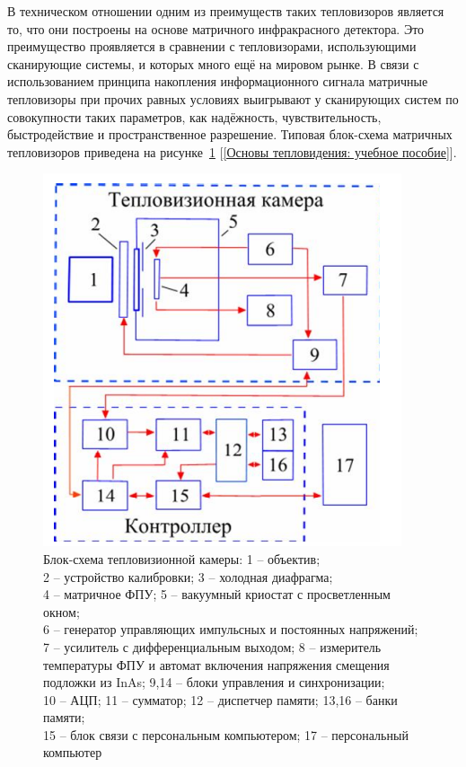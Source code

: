 \documentclass[14pt, a4paper]{extreport}
\begin{document}
	В техническом отношении одним из преимуществ таких тепловизоров является то, что они построены на основе матричного инфракрасного детектора. Это преимущество проявляется в сравнении с тепловизорами, использующими сканирующие системы, и которых много ещё на мировом рынке. В связи с использованием принципа накопления информационного сигнала матричные тепловизоры при прочих равных условиях выигрывают у сканирующих систем по совокупности таких параметров, как надёжность, чувствительность, быстродействие и пространственное разрешение. Типовая блок-схема матричных тепловизоров приведена на рисунке~\ref{fig:MatrixIRCameraScheme} [\ref{Основы тепловидения: учебное пособие}].
	
	\begin{figure}[h!]
		\centering
		\includegraphics[width = \textwidth]{image/chapter_1/MatrixIRCameraScheme}	
		\caption{Блок-схема тепловизионной камеры: 1 -- объектив;\\2 -- устройство калибровки; 3 -- холодная диафрагма;\\4 -- матричное ФПУ; 5 -- вакуумный криостат с просветленным окном;\\6 -- генератор управляющих импульсных и постоянных напряжений;\\7 -- усилитель с дифференциальным выходом; 8 -- измеритель температуры ФПУ и автомат включения напряжения смещения подложки из InAs; 9,14 -- блоки управления и синхронизации;\\10 -- АЦП; 11 -- сумматор; 12 -- диспетчер памяти; 13,16 -- банки памяти;\\15 -- блок связи с персональным компьютером; 17 -- персональный компьютер}
		\label{fig:MatrixIRCameraScheme}
	\end{figure}
	
\end{document}
